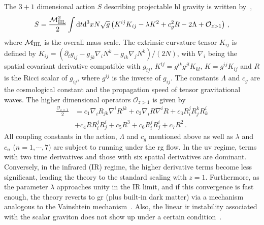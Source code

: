 \documentclass[superscriptaddress,aps,preprintnumbers,nofootinbib]{revtex4-2}
\begin{document}
The $3 + 1$ dimensional action $S$ describing projectable \ac{hl} gravity is written by~\cite{Mukohyama:2010xz},
\begin{equation}
\label{action}
S= \frac{{\cal M}_{\rm HL}^{2}}{2}\int \mathrm{d} t \mathrm{d}^3 x N \sqrt{g} \left( K^{ij}K_{ij}-\lambda K^2 +c^2_gR-2\Lambda+{\mathcal O}_{z>1} \right)\,, 
\end{equation}
where ${\cal M}_{\rm HL}$ is the overall mass scale. The extrinsic curvature tensor $K_{ij}$ is defined by $K_{ij}= (\partial_t g_{ij}- g_{j k}\nabla_iN^k-g_{i k}\nabla_jN^k)/(2N)$, with $\nabla_i$ being the spatial covariant derivative compatible with $g_{ij}$, $K^{ij}=g^{ik}g^{jl}K_{kl}$, $K=g^{ij}K_{ij}$ and $R$ is the Ricci scalar of $g_{ij}$, where $g^{ij}$ is the inverse of $g_{ij}$. The constants $\Lambda$ and $c_g$ are the cosmological constant and the propagation speed of tensor gravitational waves. The higher dimensional operators ${\mathcal O}_{z>1}$ is given by
\begin{align}
\frac{{\mathcal O}_{z>1}}{2} & = 
c_1\nabla_iR_{jk}\nabla^iR^{jk}+c_2\nabla_iR\nabla^iR+c_3R_i^jR_j^kR_k^i\nonumber\\
 &  +c_4RR_i^jR_j^i + c_5R^3 
  + c_6R_i^jR_j^i+c_7R^2 \,.
\end{align}
All coupling constants in the action, $\Lambda$ and $c_g$ mentioned above as well as $\lambda$ and $c_{n}$ ($n=1,\cdots,7$) are subject to running under the \ac{rg} flow. In the \ac{uv} regime, terms with two time derivatives and those with six spatial derivatives are dominant. Conversely, in the infrared (IR) regime, the higher derivative terms become less significant, leading the theory to the standard scaling with $z=1$. Furthermore, as the parameter $\lambda$ approaches unity in the IR limit, and if this convergence is fast enough, the theory reverts to \ac{gr} (plus built-in dark matter) via a mechanism analogous to the Vainshtein mechanism~\cite{Mukohyama:2010xz,Izumi:2011eh,Gumrukcuoglu:2011ef}. Also, the linear \ac{ir} instability associated with the scalar graviton does not show up under a certain condition~\cite{Mukohyama:2010xz}.
\end{document}
